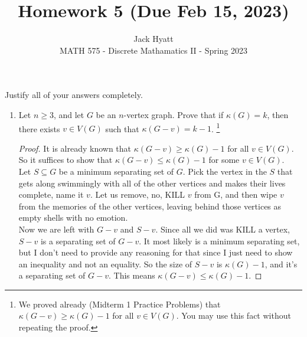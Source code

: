 \documentclass[12pt]{article}
\begin{document}
	
	
	
	\title{Homework 5 (Due Feb 15, 2023)}
	\author{Jack Hyatt\\ %
		MATH 575 - Discrete Mathamatics II - Spring 2023} 
	
	\maketitle
	
	Justify all of your answers completely.\\
	
	
	\medskip 
	
	\begin{enumerate}
	
\item Let $n \geq 3$, and let $G$ be an $n$-vertex graph. Prove that if $\kappa(G) = k$, then there exists $v \in V(G)$ such that $\kappa(G-v) = k-1$.
\footnote{We proved already (Midterm 1 Practice Problems) that $\kappa(G-v) \geq \kappa(G) -1$ for all $v \in V(G)$. You may use this fact without repeating the proof.}
\begin{proof}
	It is already known that $\kappa(G-v) \geq \kappa(G) -1$ for all $v \in V(G)$. So it suffices to show that $\kappa(G-v) \leq \kappa(G) -1$ for some $v \in V(G)$.\\
	Let $S\subseteq G$ be a minimum separating set of $G$. Pick the vertex in the $S$ that gets along swimmingly with all of the other vertices and makes their lives complete, name it $v$. Let us remove, no, \textsf{KILL} $v$ from G, and then wipe $v$ from the memories of the other vertices, leaving behind those vertices as empty shells with no emotion.\\
	Now we are left with $G-v$ and $S-v$. Since all we did was \textsf{KILL} a vertex, $S-v$ is a separating set of $G-v$. It most likely is a minimum separating set, but I don't need to provide any reasoning for that since I just need to show an inequality and not an equality. So the size of $S-v$ is $\kappa(G)-1$, and it's a separating set of $G-v$. This means $\kappa(G-v) \leq \kappa(G) -1$.
\end{proof}
\medskip


\end{enumerate}
\end{document}
